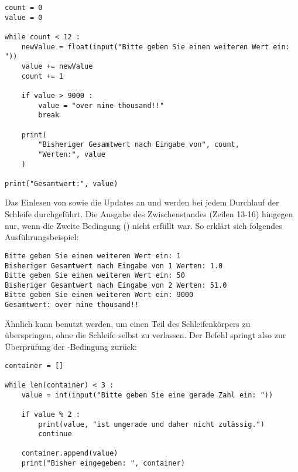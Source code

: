 \begin{codebox}
\begin{verbatim}
count = 0
value = 0

while count < 12 :
    newValue = float(input("Bitte geben Sie einen weiteren Wert ein: "))
    value += newValue
    count += 1
  
    if value > 9000 :
        value = "over nine thousand!!"
        break
  
    print(
        "Bisheriger Gesamtwert nach Eingabe von", count, 
        "Werten:", value
    )

print("Gesamtwert:", value)
\end{verbatim}
\end{codebox}

Das Einlesen von  sowie die Updates an  und  werden bei jedem Durchlauf der Schleife durchgeführt. Die Ausgabe des Zwischenstandes (Zeilen 13-16) hingegen nur, wenn die Zweite Bedingung () nicht erfüllt war. So erklärt sich folgendes Ausführungsbeispiel:

\begin{cmdbox}
\begin{verbatim}
Bitte geben Sie einen weiteren Wert ein: 1
Bisheriger Gesamtwert nach Eingabe von 1 Werten: 1.0
Bitte geben Sie einen weiteren Wert ein: 50
Bisheriger Gesamtwert nach Eingabe von 2 Werten: 51.0
Bitte geben Sie einen weiteren Wert ein: 9000
Gesamtwert: over nine thousand!!
\end{verbatim}
\end{cmdbox}

Ähnlich kann  benutzt werden, um einen Teil des Schleifenkörpers zu überspringen, ohne die Schleife selbst zu verlassen. Der Befehl  springt also zur Überprüfung der -Bedingung zurück:

\begin{codebox}
\begin{verbatim}
container = []

while len(container) < 3 :
    value = int(input("Bitte geben Sie eine gerade Zahl ein: "))
  
    if value % 2 :
        print(value, "ist ungerade und daher nicht zulässig.")
        continue
  
    container.append(value)
    print("Bisher eingegeben: ", container)
\end{verbatim}
\end{codebox}

